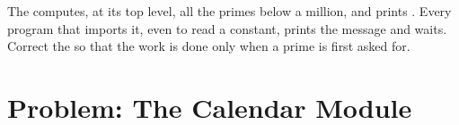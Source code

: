 \begin{exercise}[$\star\star\star$]\label{exo:g11:modules-and-interfaces:15}
The   computes, at its top level, all the primes below a million, and prints
. Every program that imports it, even to read a constant, prints the
message and waits. Correct the  so that the work is done only when a prime is first asked for.
\end{exercise}

\section{Problem: The Calendar Module}\label{sec:g11:modules-and-interfaces:problem}

